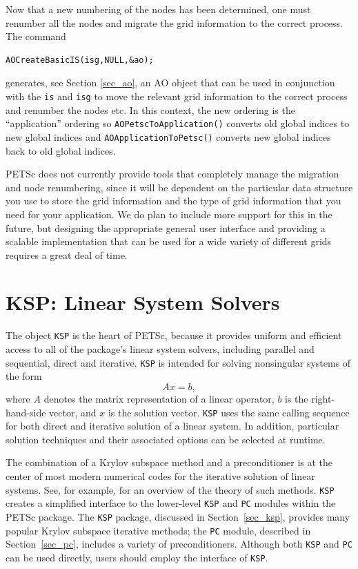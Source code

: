Now that a new numbering of the nodes has been determined, one must
renumber all the nodes and migrate the grid information to the correct process.
The command
\begin{lstlisting}
AOCreateBasicIS(isg,NULL,&ao);
\end{lstlisting}
generates, see Section \ref{sec_ao}, an AO object that can be used in conjunction with the
\lstinline{is} and \lstinline{isg} to move the relevant grid information to the correct process
and renumber the nodes etc.
In this context, the new ordering is the ``application'' ordering so \lstinline{AOPetscToApplication()}
converts old global indices to new global indices and \lstinline{AOApplicationToPetsc()} converts new
global indices back to old global indices.

PETSc does not currently provide tools that completely manage the migration and
node renumbering, since it will be dependent on the particular data structure you
use to store the grid information and the type of grid information that you need
for your application. We do plan to include more support for this in the future,
but designing the appropriate general user interface and providing a scalable
implementation that can be used for a wide variety of different grids requires a
great deal of time.


\cleardoublepage
\chapter{KSP: Linear System Solvers} 
\label{ch_ksp}

The object \lstinline{KSP} is the heart of PETSc, because it provides uniform and efficient access
to all of the package's linear system solvers, including parallel and sequential,
direct and iterative.
\lstinline{KSP} is intended for solving nonsingular systems of the form
\begin{equation}
 A x = b,
\label{eq_Ax=b}
\end{equation}
where $A$ denotes the matrix representation of a linear operator, $b$
is the right-hand-side vector, and $ x $ is the solution vector.  \lstinline{KSP}
uses the same calling sequence for both direct and iterative solution
of a linear system.  In addition, particular solution techniques and
their associated options can be selected at runtime.

The combination of a Krylov subspace method and a preconditioner is at
the center of most modern numerical codes for the iterative solution of
linear systems.  See, for example, \cite{fgn} for an overview of the theory
of such methods.  \lstinline{KSP} creates a simplified interface to the
lower-level \lstinline{KSP} and \lstinline{PC} modules within the PETSc package.  The \lstinline{KSP} package,
discussed in
Section~\ref{sec_ksp}, provides many popular Krylov
 subspace iterative methods;
the \lstinline{PC} module, described in Section~\ref{sec_pc}, includes a
variety of preconditioners.  Although both  \lstinline{KSP} and \lstinline{PC} can be used
directly, users should employ the interface of \lstinline{KSP}.

